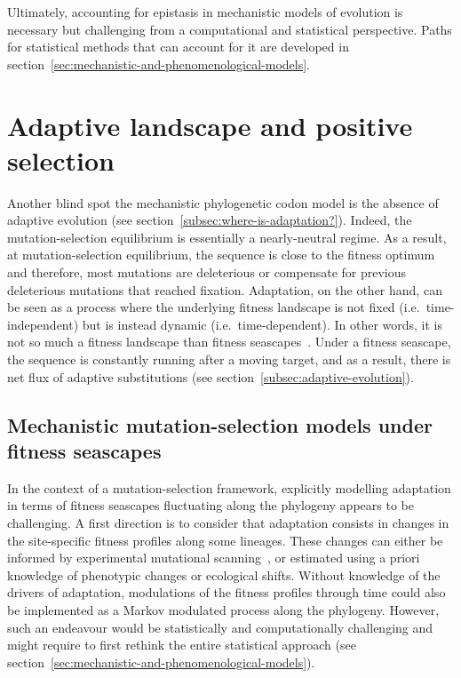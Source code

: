 Ultimately, accounting for epistasis in mechanistic models of evolution is necessary but challenging from a computational and statistical perspective.
Paths for statistical methods that can account for it are developed in section~\ref{sec:mechanistic-and-phenomenological-models}.

\section{Adaptive landscape and positive selection}
\label{sec:adaptative-landscape}

Another blind spot the mechanistic phylogenetic codon model is the absence of adaptive evolution (see section~\ref{subsec:where-is-adaptation?}).
Indeed, the mutation-selection equilibrium is essentially a nearly-neutral regime.
As a result, at mutation-selection equilibrium, the sequence is close to the fitness optimum and therefore, most mutations are deleterious or compensate for previous deleterious mutations that reached fixation.
Adaptation, on the other hand, can be seen as a process where the underlying fitness landscape is not fixed (i.e.~time-independent) but is instead dynamic (i.e.~time-dependent).
In other words, it is not so much a fitness landscape than fitness seascapes~\citep{Mustonen2009}.
Under a fitness seascape, the sequence is constantly running after a moving target, and as a result, there is net flux of adaptive substitutions (see section~\ref{subsec:adaptive-evolution}).

\subsection{Mechanistic mutation-selection models under fitness seascapes}
\label{subsec:mechanistic-fluctuating-selection}

In the context of a mutation-selection framework, explicitly modelling adaptation in terms of fitness seascapes fluctuating along the phylogeny appears to be challenging.
A first direction is to consider that adaptation consists in changes in the site-specific fitness profiles along some lineages.
These changes can either be informed by experimental mutational scanning~\citep{Bloom2017}, or estimated using a priori knowledge of phenotypic changes or ecological shifts\citep{Tamuri2009, Parto2017, Parto2018}.
Without knowledge of the drivers of adaptation, modulations of the fitness profiles through time could also be implemented as a Markov modulated process along the phylogeny.
However, such an endeavour would be statistically and computationally challenging and might require to first rethink the entire statistical approach (see section~\ref{sec:mechanistic-and-phenomenological-models}).

